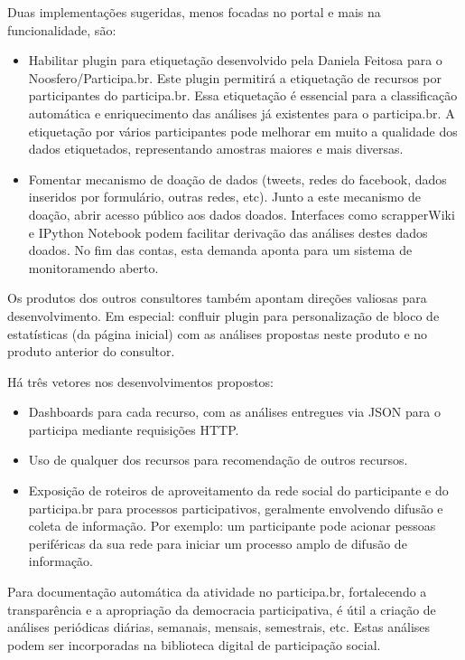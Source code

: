 \documentclass[12pt]{article}
\begin{document}
Duas implementações sugeridas, menos focadas no portal e mais na funcionalidade, são:
\begin{itemize}
    \item Habilitar plugin para etiquetação desenvolvido pela Daniela Feitosa para o Noosfero/Participa.br. Este plugin permitirá a etiquetação de recursos por participantes do participa.br. Essa etiquetação é essencial para a classificação automática e enriquecimento das análises já existentes para o participa.br. A etiquetação por vários participantes pode melhorar em muito a qualidade dos dados etiquetados, representando amostras maiores e mais diversas.
    \item Fomentar mecanismo de doação de dados (tweets, redes do facebook, dados inseridos por formulário, outras redes, etc). Junto a este mecanismo de doação, abrir acesso público aos dados doados. Interfaces como scrapperWiki e IPython Notebook podem facilitar derivação das análises destes dados doados. No fim das contas, esta demanda aponta para um sistema de monitoramendo aberto.
\end{itemize}

Os produtos dos outros consultores também apontam direções valiosas para desenvolvimento. Em especial:
    confluir plugin para personalização de bloco de estatísticas (da página inicial) com as análises propostas neste produto e no produto anterior do consultor.

Há três vetores nos desenvolvimentos propostos:
\begin{itemize}
    \item Dashboards para cada recurso, com as análises entregues via JSON para o participa mediante requisições HTTP.
    \item Uso de qualquer dos recursos para recomendação de outros recursos.
    \item Exposição de roteiros de aproveitamento da rede social do participante e do participa.br para processos participativos, geralmente envolvendo difusão e coleta de informação. Por exemplo: um participante pode acionar pessoas periféricas da sua rede para iniciar um processo amplo de difusão de informação.
\end{itemize}


Para documentação automática da atividade no participa.br, fortalecendo a transparência e a apropriação da democracia participativa, é útil a criação de análises periódicas diárias, semanais, mensais, semestrais, etc. Estas análises podem ser incorporadas na biblioteca digital de participação social.
\end{document}
